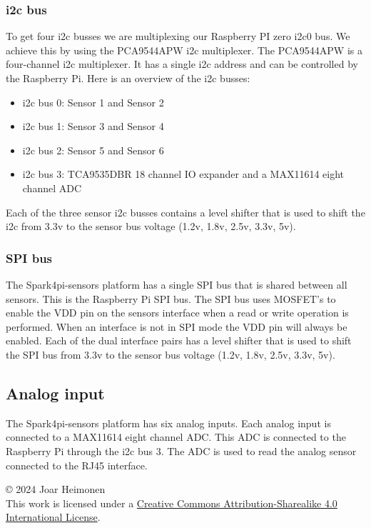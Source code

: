 \documentclass[12pt]{article}
\newcommand{\license}{
    \vspace{1em}
    \noindent\small{© 2024 Joar Heimonen\\
    This work is licensed under a \href{https://creativecommons.org/licenses/by-sa/4.0/}{Creative Commons Attribution-Sharealike 4.0 International License}.}
    \vspace{1em}
}
\begin{document}
\subsubsection{i2c bus}
To get four i2c busses we are multiplexing our Raspberry PI zero i2c0 bus. We achieve this by using the PCA9544APW i2c multiplexer.
The PCA9544APW is a four-channel i2c multiplexer. It has a single i2c address and can be controlled by the Raspberry Pi.
Here is an overview of the i2c busses:
\begin{itemize}
    \item i2c bus 0: Sensor 1 and Sensor 2
    \item i2c bus 1: Sensor 3 and Sensor 4
    \item i2c bus 2: Sensor 5 and Sensor 6
    \item i2c bus 3: TCA9535DBR 18 channel IO expander and a MAX11614 eight channel ADC
\end{itemize}
Each of the three sensor i2c busses contains a level shifter that is used to shift the i2c from 3.3v to the sensor bus voltage (1.2v, 1.8v, 2.5v, 3.3v, 5v).
\subsubsection{SPI bus}
The Spark4pi-sensors platform has a single SPI bus that is shared between all sensors. This is the Raspberry Pi SPI bus.
The SPI bus uses MOSFET's to enable the VDD pin on the sensors interface when a read or write operation is performed.
When an interface is not in SPI mode the VDD pin will always be enabled.
Each of the dual interface pairs has a level shifter that is used to shift the SPI bus from 3.3v to the sensor bus voltage (1.2v, 1.8v, 2.5v, 3.3v, 5v).
\subsection{Analog input}
The Spark4pi-sensors platform has six analog inputs. Each analog input is connected to a MAX11614 eight channel ADC.
This ADC is connected to the Raspberry Pi through the i2c bus 3. The ADC is used to read the analog sensor connected to the RJ45 interface.

\pagebreak
{}
\printbibliography
\license
\end{document}
